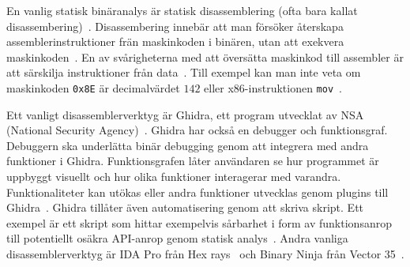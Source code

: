 En vanlig statisk binäranalys är statisk disassemblering (ofta bara kallat
disassembering)~\cite{andriesse2018}. Disassembering innebär att man försöker
återskapa assemblerinstruktioner frän maskinkoden i binären, utan att exekvera
maskinkoden~\cite{andriesse2018}. En av svårigheterna med att översätta
maskinkod till assembler är att särskilja instruktioner från
data~\cite{andriesse2018}.  Till exempel kan man inte veta om maskinkoden
\verb|0x8E| är decimalvärdet $142$ eller x86-instruktionen
\verb|mov|~\cite{andriesse2018}.

Ett vanligt disassemblerverktyg är Ghidra, ett program utvecklat av NSA
(National Security Agency)~\cite{ghidra_website}. Ghidra har också en debugger
och funktionsgraf. Debuggern ska underlätta binär debugging genom att
integrera med andra funktioner i Ghidra. Funktionsgrafen låter användaren se
hur programmet är uppbyggt visuellt och hur olika funktioner interagerar med
varandra. Funktionaliteter kan utökas eller andra funktioner utvecklas genom
plugins till Ghidra~\cite{ghidra_use_cases}. Ghidra tillåter även automatisering
genom att skriva skript. Ett exempel är ett skript som hittar exempelvis
sårbarhet i form av funktionsanrop till potentiellt osäkra API-anrop genom
statisk analys~\cite{ghidra_script}. Andra vanliga disassemblerverktyg är
IDA Pro från Hex rays~\cite{hex_rays} och Binary Ninja från Vector
35~\cite{binary_ninja}.
